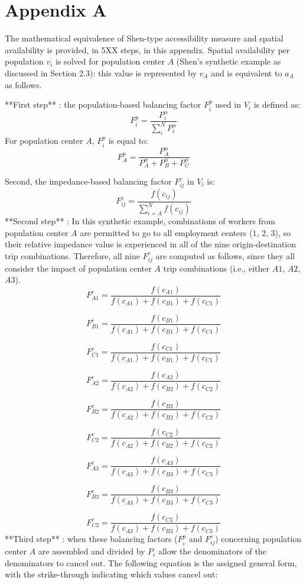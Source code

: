 \documentclass[]{elsarticle} %
\begin{document}
\hypertarget{appendix-a}{%
\section{Appendix A}\label{appendix-a}}

\begin{landscape}

The mathematical equivalence of Shen-type accessibility measure and spatial availability is provided, in 5XX steps, in this appendix. Spatial availability per population $v_i$ is solved for population center $A$ (Shen's synthetic example as discussed in Section 2.3): this value is represented by $v_A$ and is equivalent to $a_A$ as follows.

**First step** : the population-based balancing factor $F^p_{i}$ used in $V_i$ is defined as:
$$
F^p_{i} = \frac{P_{i}^\alpha}{\sum_{i}^N P_{i}^\alpha}
$$
For population center $A$, $F^p_{i}$ is equal to:
$$
F^p_{A} = \frac{P_{A}^\alpha}{P_{A}^\alpha + P_{B}^\alpha + P_{C}^\alpha}
$$

Second, the impedance-based balancing factor $F^c_{ij}$ in $V_i$ is:
$$
F^c_{ij} = \frac{f(c_{ij})}{\sum_{i=A}^N f(c_{ij})}
$$
**Second step** : In this synthetic example, combinations of workers from population center $A$ are permitted to go to all employment centers ($1$, $2$, $3$), so their relative impedance value is experienced in all of the nine origin-destination trip combinations. Therefore, all nine $F^c_{ij}$ are computed as follows, since they all consider the impact of population center $A$ trip combinations (i.e., either $A1$, $A2$, $A3$). 
$$
F^c_{A1} = \frac{f(c_{A1})}{f(c_{A1})+f(c_{B1})+f(c_{C1})}
$$

$$
F^c_{B1} = \frac{f(c_{B1})}{f(c_{A1})+f(c_{B1})+f(c_{C1})}
$$

$$
F^c_{C1} = \frac{f(c_{C1})}{f(c_{A1})+f(c_{B1})+f(c_{C1})}
$$

$$
F^c_{A2} = \frac{f(c_{A2})}{f(c_{A2})+f(c_{B2})+f(c_{C2})}
$$

$$
F^c_{B2} = \frac{f(c_{B2})}{f(c_{A2})+f(c_{B2})+f(c_{C2})}
$$

$$
F^c_{C2} = \frac{f(c_{C2})}{f(c_{A2})+f(c_{B2})+f(c_{C2})}
$$

$$
F^c_{A3} = \frac{f(c_{A3})}{f(c_{A3})+f(c_{B3})+f(c_{C3})}
$$

$$
F^c_{B3} = \frac{f(c_{B3})}{f(c_{A3})+f(c_{B3})+f(c_{C3})}
$$

$$
F^c_{C3} = \frac{f(c_{C3})}{f(c_{A3})+f(c_{B3})+f(c_{C3})}
$$
**Third step** : when these balancing factors ($F^p_{i}$ and $F^c_{ij}$) concerning population center $A$ are assembled and divided by $P_i$ allow the denominators of the denominators to cancel out. The following equation is the assigned general form, with the strike-through indicating which values cancel out:


\end{landscape}
\end{document}
